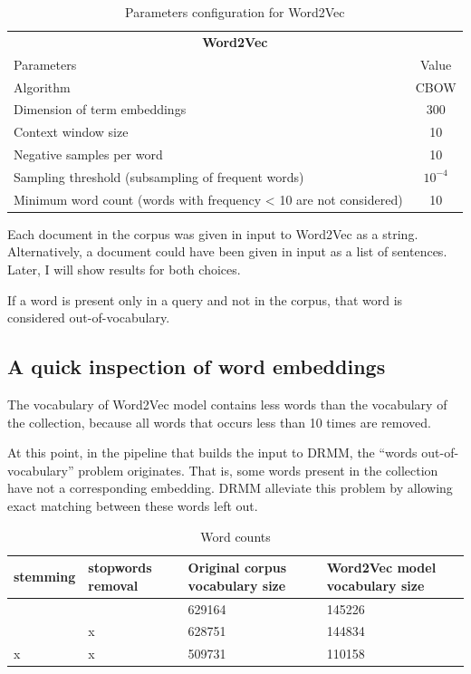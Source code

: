 \begin{table}[H]
\centering
\begin{tabular}{p{8cm}|c}
\multicolumn{2}{c}{\textbf{Word2Vec}} \\
Parameters & Value \\ \hline
Algorithm & CBOW \\
Dimension of term embeddings & 300 \\
Context window size & 10 \\
Negative samples per word & 10 \\
Sampling threshold (subsampling of frequent words) & $10^{-4}$ \\
Minimum word count (words with frequency < 10 are not considered) & 10 \\ \hline
\end{tabular}
\caption{Parameters configuration for Word2Vec}
\label{table:w2v_config}
\end{table}

Each document in the corpus was given in input to Word2Vec as a string. Alternatively, a document could have been given in input as a list of sentences. Later, I will show results for both choices.

If a word is present only in a query and not in the corpus, that word is considered out-of-vocabulary.

\subsection{A quick inspection of word embeddings}

The vocabulary of Word2Vec model contains less words than the vocabulary of the collection, because all words that occurs less than 10 times are removed.

At this point, in the pipeline that builds the input to DRMM, the ``words out-of-vocabulary'' problem originates. That is, some words present in the collection have not a corresponding embedding. DRMM alleviate this problem by allowing exact matching between these words left out.

\begin{table}[H]
\centering
\begin{tabular}{p{2cm}p{2cm}p{4cm}p{4cm}}
\textbf{stemming} & \textbf{stopwords removal} & \textbf{Original corpus vocabulary size} & \textbf{Word2Vec model vocabulary size} \\ \hline
& & 629164 & 145226 \\
& x & 628751 & 144834 \\
x & x & 509731 & 110158 \\
\end{tabular}
\caption{Word counts}
\end{table}

